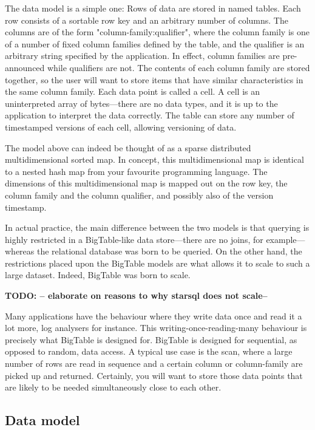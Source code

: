 \documentclass[a4paper,10pt]{book}
\begin{document}
The data model is a simple one: Rows of data are stored in named tables.
Each row consists of a sortable row key and an arbitrary number of columns.
The columns are of the form "column-family:qualifier", where the column
family is one of a number of fixed column families defined by the table,
and the qualifier is an arbitrary string specified by the application. In
effect, column families are pre-announced while qualifiers are not. The
contents of each column family are stored together, so the user will want
to store items that have similar characteristics in the same column family.
Each data point is called a cell. A cell is an uninterpreted array of
bytes---there are no data types, and it is up to the application to
interpret the data correctly. The table can store any number of timestamped
versions of each cell, allowing versioning of data.

The model above can indeed be thought of as a sparse distributed
multidimensional sorted map. In concept, this multidimensional map is
identical to a nested hash map from your favourite programming language. The
dimensions of this multidimensional map is mapped out on the row key, the
column family and the column qualifier, and possibly also of the version
timestamp.

In actual practice, the main difference between the two models is that
querying is highly restricted in a BigTable-like data store---there are no
joins, for example---whereas the relational database was born to be queried.
On the other hand, the restrictions placed upon the BigTable models are
what allows it to scale to such a large dataset. Indeed, BigTable was born
to scale.

\textbf{TODO: -- elaborate on reasons to why starsql does not scale--}

Many applications have the behaviour where they write data once and read it
a lot more, log analysers for instance. This writing-once-reading-many
behaviour is precisely what BigTable is designed for. BigTable is designed
for sequential, as opposed to random, data access. A typical use case is
the scan, where a large number of rows are read in sequence and a certain
column or column-family are picked up and returned. Certainly, you will
want to store those data points that are likely to be needed simultaneously
close to each other. \cite{bigtable}


\subsection{Data model}
\end{document}
